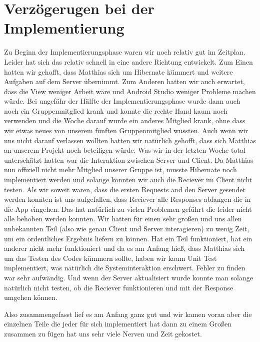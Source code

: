 \section{Verzögerugen bei der Implementierung}

Zu Beginn der Implementierungsphase waren wir noch relativ gut im Zeitplan. Leider hat sich das relativ schnell in eine andere Richtung entwickelt.
Zum Einen hatten wir gehofft, dass Matthias sich um Hibernate kümmert und weitere Aufgaben auf dem Server übernimmt. Zum Anderen hatten wir auch erwartet, dass die View weniger Arbeit wäre und Android Studio weniger Probleme machen würde.
Bei ungefähr der Hälfte der Implementierungsphase wurde dann auch noch ein Gruppenmitglied krank und konnte die rechte Hand kaum noch verwenden und die Woche darauf wurde ein anderes Mitglied krank, ohne dass wir etwas neues von unserem fünften Gruppenmitglied wussten. Auch wenn wir uns nicht darauf verlassen wollten hatten wir natürlich gehofft, dass sich Matthias an unserem Projekt noch beteiligen würde.
Was wir in der letzten Woche total unterschätzt hatten war die Interaktion zwischen Server und Client. Da Matthias nun offiziell nicht mehr Mitglied unserer Gruppe ist, musste Hibernate noch implementiert werden und solange konnten wir auch die Reciever im Client nicht testen. Als wir soweit waren, dass die ersten Requests and den Server gesendet werden konnten ist uns aufgefallen, dass Reciever alle Responses abfangen die in die App eingehen. Das hat natürlich zu vielen Problemen geführt die leider nicht alle behoben werden konnten. 
Wir hatten für einen sehr großen und uns allen unbekannten Teil (also wie genau Client und Server interagieren) zu wenig Zeit, um ein ordentliches Ergebnis liefern zu können. Hat ein Teil funktioniert, hat ein anderer nicht mehr funktioniert und da es am Anfang hieß, dass Matthias sich um das Testen des Codes kümmern sollte, haben wir kaum Unit Test implementiert, was natürlich die Systeminteraktion erschwert. Fehler zu finden war sehr aufwändig. Und wenn der Server aktualisiert wurde konnte man solange natürlich nicht testen, ob die Reciever funktionieren und mit der Response umgehen können.

Also zusammengefasst lief es am Anfang ganz gut und wir kamen voran aber die einzelnen Teile die jeder für sich implementiert hat dann zu einem Großen zusammen zu fügen hat uns sehr viele Nerven und Zeit gekostet. 